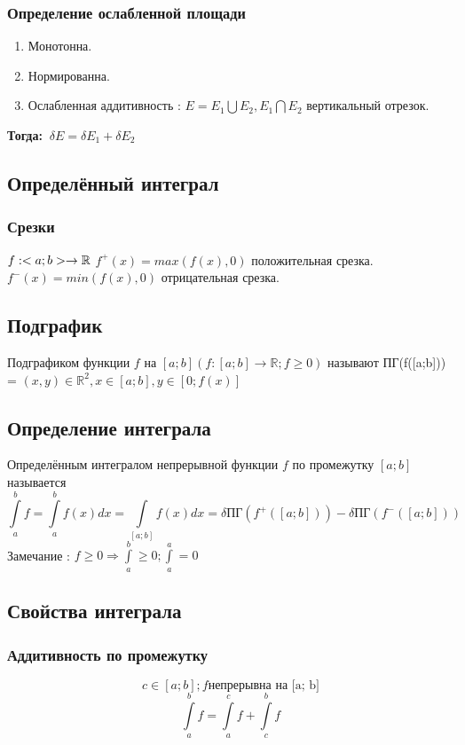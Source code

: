 \documentclass[12pt, a4paper]{article}
\newcommand{\nl}{\newline}
\newcommand{\then}{\textbf{Тогда:}}
\begin{document}
	\subsubsection{Определение ослабленной площади}
	\begin{enumerate}
		\item Монотонна.
		\item Нормированна.
		\item Ослабленная аддитивность : $E = E_1 \bigcup E_2, E_1 \bigcap E_2$ вертикальный отрезок.
	\end{enumerate}
	\then $\;\; \delta E = \delta E_1 + \delta E_2$
	
	
	\subsection{Определённый интеграл}
	\subsubsection{Срезки}
	
	$f : <a; b> \rightarrow \mathbb{R} \nl$
	$f^+(x) = max(f(x), 0)$ положительная срезка. \nl
	$f^-(x) = min(f(x), 0)$ отрицательная срезка. \nl
	
	\subsection{Подграфик}
	Подграфиком функции $f$ на $[a; b] (f : [a;b]\rightarrow \mathbb{R}; f \geqslant 0)$ называют \nl
	ПГ(f([a;b])) = {$(x, y) \in \mathbb{R}^2, x \in [a; b], y \in [0; f(x)]$}
	
	\subsection{Определение интеграла}
	Определённым интегралом непрерывной функции $f$ по промежутку $[a;b]$ называется 
	$$ \int\limits^b_a f = \int\limits^b_a f(x) dx = \int\limits_{[a; b]} f(x) dx = \delta \text{ПГ}(f^+([a; b])) - \delta \text{ПГ}(f^-([a; b])) $$
	Замечание : $f \geq 0 \Rightarrow \int\limits^b_a \geq 0; \int\limits^a_a = 0$
	
	\subsection{Свойства интеграла}
	\subsubsection{Аддитивность по промежутку}
	$$c \in [a;b]; f \text{непрерывна на [a; b]}$$
	$$\int\limits_a^b f = \int\limits_a^c f + \int\limits^b_c f$$
	
\end{document}
